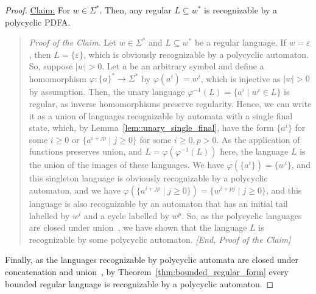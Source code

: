 \begin{proof}
 \noindent\underline{Claim:} For $w \in \Sigma^*$.
  Then, any regular $L \subseteq w^*$
  is recognizable by a polycyclic PDFA.
 \begin{quote}
     \emph{Proof of the Claim.}
      Let $w \in \Sigma^*$ and $L \subseteq w^*$ be a regular language.
 If $w = \varepsilon$, then $L = \{\varepsilon\}$, which is obviously recognizable
 by a polycyclic automaton. So, suppose $|w| > 0$.
%
%
 Let $a$ be an arbitrary symbol
 and define a homomorphism $\varphi : \{a\}^* \to \Sigma^*$
 by $\varphi(a^i) = w^i$, which is injective as $|w| > 0$ by assumption.
 Then, the unary language $\varphi^{-1}(L) = \{ a^i \mid w^i \in L\}$ is regular, as inverse
 homomorphisms preserve regularity.
 Hence, we can write it as a union of languages recognizable by automata
 with a single final state, which, by Lemma~\ref{lem::unary_single_final},
 have the form $\{ a^i \}$ for some $i \ge 0$
 or $\{ a^{i + jp} \mid j \ge 0 \}$ for some $i \ge 0, p > 0$.
 As the application of functions preserves union, and $L = \varphi(\varphi^{-1}(L))$ here,
 the language 
 $L$ is the union of the images of these languages.
 We have $\varphi(\{a^i \}) = \{ w^i \}$, and this singleton language
 is obviously recognizable by a polycyclic automaton,
 and we have $\varphi(\{ a^{i + jp} \mid j \ge 0 \}) = \{ w^{i+pj} \mid j \ge 0 \}$,
 and this language is also recognizable by an automaton that
 has an initial tail labelled by $w^i$ and a cycle labelled by $w^p$.
 So, as the polycyclic languages are closed under union~\cite[Proposition 6]{DBLP:conf/ictcs/Hoffmann20},
 we have shown that the language $L$ %
 is recognizable by some polycyclic automaton.     \emph{[End, Proof of the Claim]}
 \end{quote}
 Finally, as the languages recognizable by polycyclic automata
 are closed under concatenation and union~\cite[Proposition 5 and Proposition 6]{DBLP:conf/ictcs/Hoffmann20},
 by Theorem~\ref{thm:bounded_regular_form} every bounded regular language is recognizable by a polycyclic automaton.
\end{proof}

